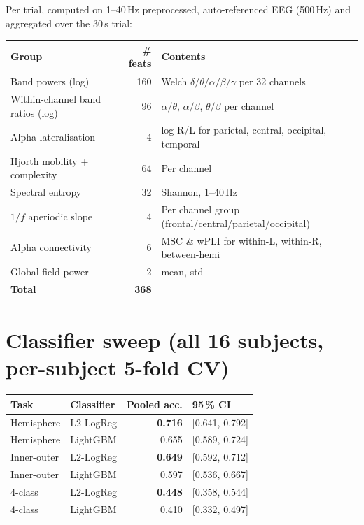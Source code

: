 Per trial, computed on 1--40\,Hz preprocessed, auto-referenced EEG (500\,Hz)
and aggregated over the 30\,s trial:

\begin{table}[ht]
\centering
\begin{tabular}{lrl}
\toprule
Group & \# feats & Contents \\
\midrule
Band powers (log) & 160 & Welch $\delta/\theta/\alpha/\beta/\gamma$ per 32 channels \\
Within-channel band ratios (log) & 96 & $\alpha/\theta$, $\alpha/\beta$, $\theta/\beta$ per channel \\
Alpha lateralisation & 4 & log R/L for parietal, central, occipital, temporal \\
Hjorth mobility + complexity & 64 & Per channel \\
Spectral entropy & 32 & Shannon, 1--40\,Hz \\
$1/f$ aperiodic slope & 4 & Per channel group (frontal/central/parietal/occipital) \\
Alpha connectivity & 6 & MSC \& wPLI for within-L, within-R, between-hemi \\
Global field power & 2 & mean, std \\
\midrule
\textbf{Total} & \textbf{368} & \\
\bottomrule
\end{tabular}
\end{table}

\section{Classifier sweep (all 16 subjects, per-subject 5-fold CV)}

\begin{table}[ht]
\centering
\begin{tabular}{llrl}
\toprule
Task & Classifier & Pooled acc. & 95\,\% CI \\
\midrule
Hemisphere  & L2-LogReg       & \textbf{0.716} & [0.641, 0.792] \\
Hemisphere  & LightGBM        & 0.655          & [0.589, 0.724] \\
Inner-outer & L2-LogReg       & \textbf{0.649} & [0.592, 0.712] \\
Inner-outer & LightGBM        & 0.597          & [0.536, 0.667] \\
4-class     & L2-LogReg       & \textbf{0.448} & [0.358, 0.544] \\
4-class     & LightGBM        & 0.410          & [0.332, 0.497] \\
\bottomrule
\end{tabular}
\end{table}

